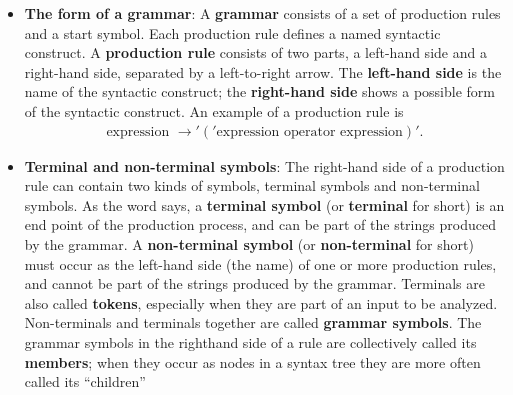 \documentclass{report}
\begin{document}
\begin{itemize}
            \begin{center}
                BEGIN print ("Hi!") END
            \end{center}
            consists of 6 symbols (tokens) and could be an element of the set of strings of symbols generated by a programming language grammar, or in more normal words, be a program in some programming language. This cut-and-dried view of a programming language would be useless but for the fact that the strings are constructed in a structured fashion; and to this structure semantics can be attached.
            \bigbreak \noindent 
            the six tokens produced by a lexical analyzer are:
            \begin{itemize}
                \item \textbf{BEGIN:} keyword
                \item \textbf{print:} identifier (or keyword, depending on the language specification)
                \item \textbf{(:} left parenthesis
                \item \textbf{"Hi!":} string literal
                \item \textbf{):} right parenthesis
                \item \textbf{END:} keyword
            \end{itemize}
        \item \textbf{The form of a grammar}: A \textbf{grammar} consists of a set of production rules and a start symbol. Each production rule defines a named syntactic construct. A \textbf{production rule} consists of two parts, a left-hand side and a right-hand side, separated by a left-to-right arrow. The \textbf{left-hand side} is the name of the syntactic construct; the \textbf{right-hand side} shows a possible form of the syntactic construct. An example of a production rule is
            \begin{align*}
                \text{expression } \to '('\text{expression operator expression})'
            .\end{align*}
        \item \textbf{Terminal and non-terminal symbols}: The right-hand side of a production rule can contain two kinds of symbols, terminal symbols and non-terminal symbols. As the word says, a \textbf{terminal symbol} (or \textbf{terminal} for short) is an end point of the production process, and can be part of the strings produced by the grammar. A \textbf{non-terminal symbol} (or \textbf{non-terminal} for short) must occur as the left-hand side (the name) of one or more production rules, and cannot be part of the strings produced by the grammar. Terminals are also called \textbf{tokens}, especially when they are part of an input to be analyzed. Non-terminals and terminals together are called \textbf{grammar symbols}. The grammar symbols in the righthand side of a rule are collectively called its \textbf{members}; when they occur as nodes in a syntax tree they are more often called its “children”

\end{itemize}
\end{document}
